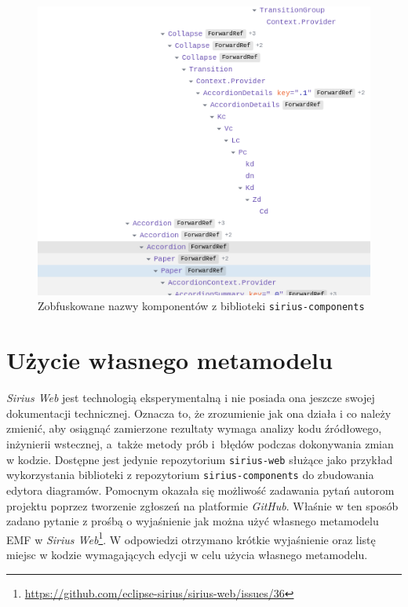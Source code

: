 \begin{figure}[!hb]
  \centering

  \includegraphics[width=0.7\linewidth]{./images/sirius-web-minified-component-names.png}
  \caption{Zobfuskowane nazwy komponentów z biblioteki
    \texttt{sirius-components}}\label{rys:sirius-web-minified-component-names}
\end{figure}

\section{Użycie własnego metamodelu}

\emph{Sirius Web} jest technologią eksperymentalną i nie posiada ona jeszcze
swojej dokumentacji technicznej. Oznacza to, że zrozumienie jak ona działa i co
należy zmienić, aby osiągnąć zamierzone rezultaty wymaga analizy kodu
źródłowego, inżynierii wstecznej, a~także metody prób i~błędów podczas
dokonywania zmian w
kodzie. Dostępne jest jedynie repozytorium \texttt{sirius-web} służące jako
przykład wykorzystania biblioteki z repozytorium \texttt{sirius-components}
do zbudowania edytora diagramów.
Pomocnym okazała się możliwość zadawania pytań autorom projektu poprzez
tworzenie zgłoszeń na platformie \emph{GitHub}. Właśnie w ten sposób zadano
pytanie z prośbą o wyjaśnienie jak można użyć własnego metamodelu \gls{EMF} w
\emph{Sirius Web}\footnote{
	\url{https://github.com/eclipse-sirius/sirius-web/issues/36}
}. W odpowiedzi otrzymano krótkie wyjaśnienie oraz listę miejsc w kodzie
wymagających edycji w celu użycia własnego metamodelu.

